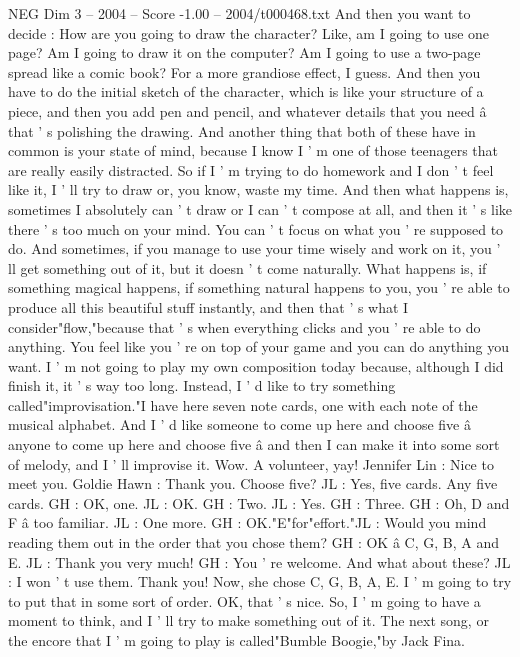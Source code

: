 \begin{textsample}{NEG Dim 3 – 2004 – Score -1.00 – 2004/t000468.txt}
And then you want to decide : How are you going to draw the character?
Like, am I going to use one page?
Am I going to draw it on the computer?
Am I going to use a two-page spread like a comic book?
For a more grandiose effect, I guess.
And then you have to do the initial sketch of the character, which is like your structure of a piece, and then you add pen and pencil, and whatever details that you need â that ' s polishing the drawing.
And another thing that both of these have in common is your state of mind, because I know I ' m one of those teenagers that are really easily distracted.
So if I ' m trying to do homework and I don ' t feel like it, I ' ll try to draw or, you know, waste my time.
And then what happens is, sometimes I absolutely can ' t draw or I can ' t compose at all, and then it ' s like there ' s too much on your mind.
You can ' t focus on what you ' re supposed to do.
And sometimes, if you manage to use your time wisely and work on it, you ' ll get something out of it, but it doesn ' t come naturally.
What happens is, if something magical happens, if something natural happens to you, you ' re able to produce all this beautiful stuff instantly, and then that ' s what I consider"flow,"because that ' s when everything clicks and you ' re able to do anything.
You feel like you ' re on top of your game and you can do anything you want.
I ' m not going to play my own composition today because, although I did finish it, it ' s way too long.
Instead, I ' d like to try something called"improvisation."I have here seven note cards, one with each note of the musical alphabet.
And I ' d like someone to come up here and choose five â anyone to come up here and choose five â and then I can make it into some sort of melody, and I ' ll improvise it.
Wow.
A volunteer, yay!
Jennifer Lin : Nice to meet you.
Goldie Hawn : Thank you.
Choose five?
JL : Yes, five cards.
Any five cards.
GH : OK, one.
JL : OK.
GH : Two.
JL : Yes.
GH : Three.
GH : Oh, D and F â too familiar.
JL : One more.
GH : OK."E"for"effort."JL : Would you mind reading them out in the order that you chose them?
GH : OK â C, G, B, A and E.
JL : Thank you very much!
GH : You ' re welcome.
And what about these?
JL : I won ' t use them.
Thank you!
Now, she chose C, G, B, A, E.
I ' m going to try to put that in some sort of order.
OK, that ' s nice.
So, I ' m going to have a moment to think, and I ' ll try to make something out of it.
The next song, or the encore that I ' m going to play is called"Bumble Boogie,"by Jack Fina.

\end{textsample}
